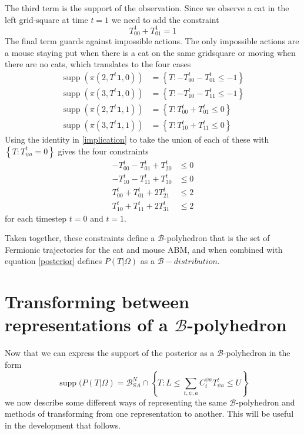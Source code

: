 \documentclass{article}
\DeclareMathOperator\supp{supp}
\begin{document}
The third term is the support of the observation. Since we observe a cat in the left grid-square at time $t=1$ we need to add the constraint
\[
T^1_{0 0} + T^1_{0 1} = 1
\]
The final term guards against impossible actions. The only impossible actions are a mouse staying put when there is a cat on the same gridsquare or moving when there are no cats, which translates to the four cases
\[
\begin{aligned}
\supp(\pi(2,T^t\mathbf{1},0)) &= \left\{ T: -T^t_{0 0} - T^t_{0 1} \le -1 \right\}\\
\supp(\pi(3,T^t\mathbf{1},0)) &= \left\{ T: -T^t_{1 0} - T^t_{1 1} \le -1 \right\}\\
\supp(\pi(2,T^t\mathbf{1},1)) &= \left\{ T: T^t_{0 0} + T^t_{0 1} \le 0 \right\}\\
\supp(\pi(3,T^t\mathbf{1},1)) &= \left\{ T: T^t_{1 0} + T^t_{1 1} \le 0 \right\}
\end{aligned}
\]
Using the identity in \ref{implication} to take the union of each of these with $\left\{T: T^t_{\psi a} = 0\right\}$ gives the four constraints
\[
\begin{aligned}
-T^t_{0 0} - T^t_{0 1} + T^t_{2 0} & \le 0\\
-T^t_{1 0} - T^t_{1 1} + T^t_{3 0} & \le 0\\
T^t_{0 0} + T^t_{0 1} + 2T^t_{2 1} & \le 2 \\
T^t_{1 0} + T^t_{1 1} + 2T^t_{3 1} & \le 2
\end{aligned}
\]
for each timestep $t=0$ and $t=1$.

Taken together, these constraints define a $\mathcal{B}$-polyhedron that is the set of Fermionic trajectories for the cat and mouse ABM, and when combined with equation \ref{posterior} defines $P(T|\Omega)$ as a $\mathcal{B}-distribution$.

\section{Transforming between representations of a $\mathcal{B}$-polyhedron}

Now that we can express the support of the posterior as a $\mathcal{B}$-polyhedron in the form
\begin{equation}
\supp(P(T|\Omega) = \mathcal{B}^N_{SA} \cap \left\{T: L \le \sum_{t,\psi,a} C^{\psi a}_t T^t_{\psi a} \le U \right\}
\label{bPolySupport}
\end{equation}
we now describe some different ways of representing the same $\mathcal{B}$-polyhedron and methods of transforming from one representation to another. This will be useful in the development that follows.
\end{document}
